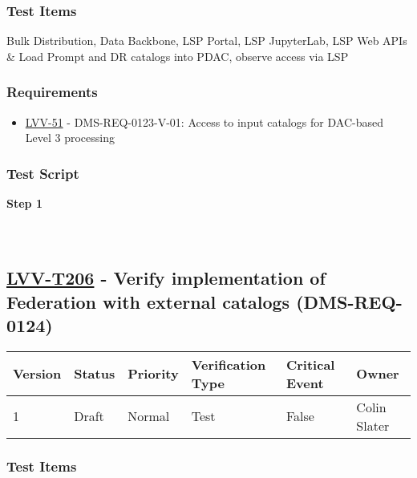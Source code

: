 \hypertarget{test-items-105}{%
\subsubsection{Test Items}\label{test-items-105}}

Bulk Distribution, Data Backbone, LSP Portal, LSP JupyterLab, LSP Web
APIs \& Load Prompt and DR catalogs into PDAC, observe access via LSP

\hypertarget{requirements-105}{%
\subsubsection{Requirements}\label{requirements-105}}

\begin{itemize}
\tightlist
\item
  \href{https://jira.lsstcorp.org/browse/LVV-51}{LVV-51} -
  DMS-REQ-0123-V-01: Access to input catalogs for DAC-based Level 3
  processing
\end{itemize}

\hypertarget{test-script-105}{%
\subsubsection{Test Script}\label{test-script-105}}

\textbf{Step 1}\\
~\\
~\\

\hypertarget{lvv-t206---verify-implementation-of-federation-with-external-catalogs-dms-req-0124}{%
\subsection{\texorpdfstring{\href{https://jira.lsstcorp.org/secure/Tests.jspa\#/testCase/LVV-T206}{LVV-T206}
- Verify implementation of Federation with external catalogs
(DMS-REQ-0124)}{LVV-T206 - Verify implementation of Federation with external catalogs (DMS-REQ-0124)}}\label{lvv-t206---verify-implementation-of-federation-with-external-catalogs-dms-req-0124}}

\begin{longtable}[]{@{}llllll@{}}
\toprule
Version & Status & Priority & Verification Type & Critical Event &
Owner\tabularnewline
\midrule
\endhead
1 & Draft & Normal & Test & False & Colin Slater\tabularnewline
\bottomrule
\end{longtable}

\hypertarget{test-items-106}{%
\subsubsection{Test Items}\label{test-items-106}}

